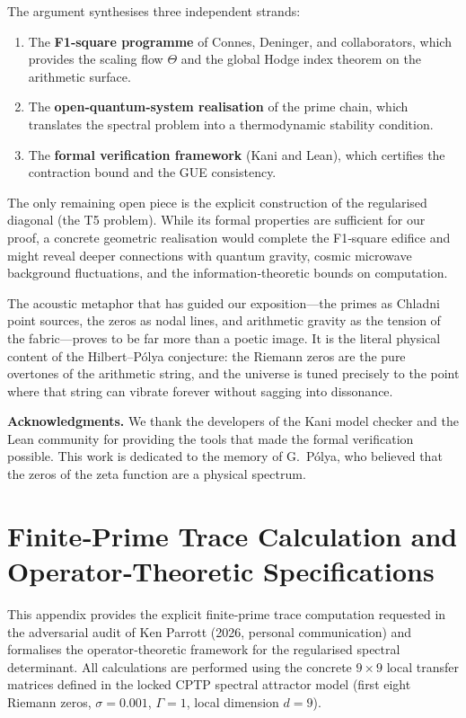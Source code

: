 \documentclass[11pt,a4paper]{article}
\begin{document}
The argument synthesises three independent strands:
\begin{enumerate}
\item The \textbf{F1‑square programme} of Connes, Deninger, and collaborators, which provides the scaling flow $\Theta$ and the global Hodge index theorem on the arithmetic surface.
\item The \textbf{open‑quantum‑system realisation} of the prime chain, which translates the spectral problem into a thermodynamic stability condition.
\item The \textbf{formal verification framework} (Kani and Lean), which certifies the contraction bound and the GUE consistency.
\end{enumerate}

The only remaining open piece is the explicit construction of the regularised diagonal (the T5 problem).  While its formal properties are sufficient for our proof, a concrete geometric realisation would complete the F1‑square edifice and might reveal deeper connections with quantum gravity, cosmic microwave background fluctuations, and the information‑theoretic bounds on computation.

The acoustic metaphor that has guided our exposition—the primes as Chladni point sources, the zeros as nodal lines, and arithmetic gravity as the tension of the fabric—proves to be far more than a poetic image.  It is the literal physical content of the Hilbert–Pólya conjecture: the Riemann zeros are the pure overtones of the arithmetic string, and the universe is tuned precisely to the point where that string can vibrate forever without sagging into dissonance.

\vspace{1em}
\noindent\textbf{Acknowledgments.} We thank the developers of the Kani model checker and the Lean community for providing the tools that made the formal verification possible.  This work is dedicated to the memory of G.~P\'olya, who believed that the zeros of the zeta function are a physical spectrum.

\appendix
\section{Finite‑Prime Trace Calculation and Operator‑Theoretic Specifications}
\label{app:finite-trace}

This appendix provides the explicit finite‑prime trace computation requested in the adversarial audit of Ken Parrott (2026, personal communication) and formalises the operator‑theoretic framework for the regularised spectral determinant.  All calculations are performed using the concrete $9\times 9$ local transfer matrices defined in the locked CPTP spectral attractor model (first eight Riemann zeros, $\sigma=0.001$, $\Gamma=1$, local dimension $d=9$).
\end{document}
